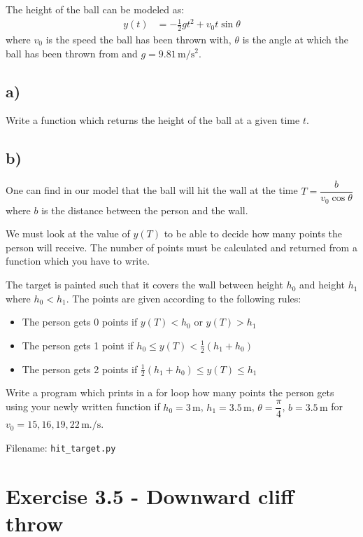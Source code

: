 \documentclass[10pt,a4paper]{article}
\begin{document}
	The height of the ball can be modeled as:
	\begin{align*}
		y(t) &= -\frac{1}{2}g t^2 + v_0t\sin\theta
	\end{align*}
	where $v_0$ is the speed the ball has been thrown with, $\theta$ is the angle at which the ball has been thrown from and $g = 9.81\, \mathrm{m/s^2}$.
	
	\subsection*{a)}
	Write a function which returns the height of the ball at a given time $t$. 
	\subsection*{b)}
	
	One can find in our model that the ball will hit the wall at the time $T = \dfrac{b }{v_0\cos\theta}$ where $b$ is the distance between the person and the wall.  
	
	We must look at the value of $y(T)$ to be able to decide how many points the person will receive. The number of points must be calculated and returned from a function which you have to write.
	
	The target is painted such that it covers the wall between height $h_0$ and height $h_1$ where $h_0 < h_1$. The points are given according to the following rules: 
	\vspace{.2cm}
	\begin{itemize}
		\item The person gets 0 points if $y(T) < h_0 \text{ or } y(T) > h_1$
		\item The person gets 1 point if  $h_0 \leq y(T) <\frac{1}{2}(h_1 + h_0)$
		\item The person gets 2 points if $\frac{1}{2}(h_1 + h_0) \leq y(T) \leq h_1$
	\end{itemize} 
	\vspace{.2cm}
	
	Write a program which prints in a for loop how many points the person gets using your newly written function if $h_0 = 3\,\si{\meter}$, $h_1 = 3.5\,\si{\meter}$, $\theta = \dfrac{\pi}{4}$, $b = 3.5\,\si{\meter}$ for $v_0 = 15,16,19,22\,\si{\meter.\per\second}$.
	
	Filename: \texttt{hit\_target.py}


\section*{Exercise 3.5 - Downward cliff throw}
\end{document}
